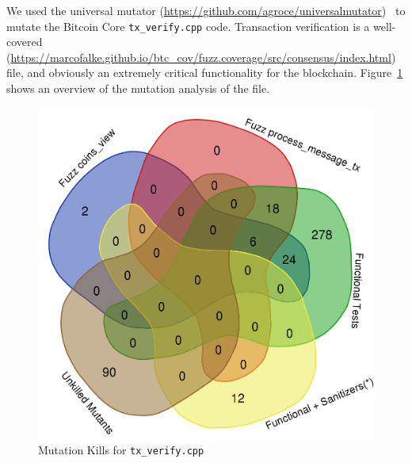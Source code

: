 \begin{sloppypar}
We used the universal mutator
(\url{https://github.com/agroce/universalmutator})~\cite{regexpMut} to
mutate the Bitcoin Core {\tt tx\_verify.cpp} code.  Transaction
verification is a well-covered
(\url{https://marcofalke.github.io/btc_cov/fuzz.coverage/src/consensus/index.html})
file, and obviously an extremely critical functionality for the
blockchain.  Figure~\ref{kills} shows an overview of the mutation
analysis of the file.

\begin{figure}
\vspace{2mm}
\includegraphics[width=0.9\columnwidth]{kill_pre_valgrind.png}
\caption{Mutation Kills for {\tt tx\_verify.cpp}}
\label{kills}
\end{figure}


\end{sloppypar}
